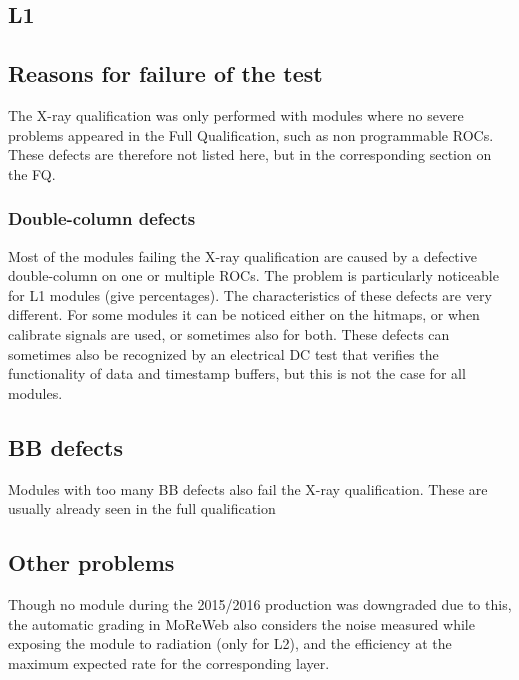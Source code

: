 \documentclass[a4paper,12pt,twoside]{article}
\begin{document}
\subsection{L1}
\subsection{Reasons for failure of the test}
The X-ray qualification was only performed with modules where no severe problems appeared in the Full Qualification, such as non programmable ROCs. These defects are therefore not listed here, but in the corresponding section on the FQ.
\subsubsection{Double-column defects}
Most of the modules failing the X-ray qualification are caused by a defective double-column on one or multiple ROCs. The problem is particularly noticeable for L1 modules (give percentages). The characteristics of these defects are very different. For some modules it can be noticed either on the hitmaps, or when calibrate signals are used, or sometimes also for both. These defects can sometimes also be recognized by an electrical DC test that verifies the functionality of data and timestamp buffers, but this is not the case for all modules. 
\subsection{BB defects}
Modules with too many BB defects also fail the X-ray qualification. These are usually already seen in the full qualification
\subsection{Other problems}
Though no module during the 2015/2016 production was downgraded due to this, the automatic grading in MoReWeb also considers the noise measured while exposing the module to radiation (only for L2), and the efficiency at the maximum expected rate for the corresponding layer. 
\end{document}
